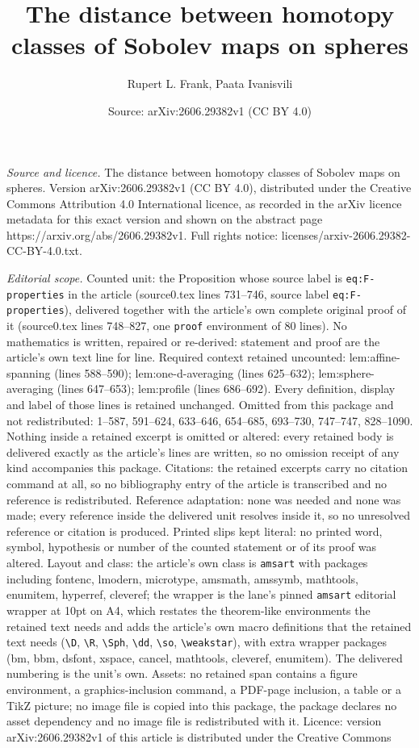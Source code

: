 \documentclass[10pt,a4paper]{amsart}
\title[The distance between homotopy classes of Sobolev maps on sph]{The distance between homotopy classes of Sobolev maps on spheres}
\author{Rupert L. Frank, Paata Ivanisvili}
\date{Source: arXiv:2606.29382v1 (CC BY 4.0)}
\begin{document}
\maketitle

\noindent\emph{Source and licence.} The distance between homotopy classes of Sobolev maps on spheres. Version arXiv:2606.29382v1 (CC BY 4.0), distributed under the Creative Commons Attribution 4.0 International licence, as recorded in the arXiv licence metadata for this exact version and shown on the abstract page https://arxiv.org/abs/2606.29382v1. Full rights notice: licenses/arxiv-2606.29382-CC-BY-4.0.txt.\par\smallskip

\noindent\textit{Editorial scope.} Counted unit: the Proposition whose source label is \texttt{eq:F-properties} in the article (source0.tex lines 731--746, source label \texttt{eq:F-properties}), delivered together with the article's own complete original proof of it (source0.tex lines 748--827, one \texttt{proof} environment of 80 lines). No mathematics is written, repaired or re-derived: statement and proof are the article's own text line for line. Required context retained uncounted: lem:affine-spanning (lines 588--590); lem:one-d-averaging (lines 625--632); lem:sphere-averaging (lines 647--653); lem:profile (lines 686--692). Every definition, display and label of those lines is retained unchanged. Omitted from this package and not redistributed: 1--587, 591--624, 633--646, 654--685, 693--730, 747--747, 828--1090. Nothing inside a retained excerpt is omitted or altered: every retained body is delivered exactly as the article's lines are written, so no omission receipt of any kind accompanies this package. Citations: the retained excerpts carry no citation command at all, so no bibliography entry of the article is transcribed and no reference is redistributed. Reference adaptation: none was needed and none was made; every reference inside the delivered unit resolves inside it, so no unresolved reference or citation is produced. Printed slips kept literal: no printed word, symbol, hypothesis or number of the counted statement or of its proof was altered. Layout and class: the article's own class is \texttt{amsart} with packages including fontenc, lmodern, microtype, amsmath, amssymb, mathtools, enumitem, hyperref, cleveref; the wrapper is the lane's pinned \texttt{amsart} editorial wrapper at 10pt on A4, which restates the theorem-like environments the retained text needs and adds the article's own macro definitions that the retained text needs (\texttt{\textbackslash D}, \texttt{\textbackslash R}, \texttt{\textbackslash Sph}, \texttt{\textbackslash dd}, \texttt{\textbackslash so}, \texttt{\textbackslash weakstar}), with extra wrapper packages (bm, bbm, dsfont, xspace, cancel, mathtools, cleveref, enumitem). The delivered numbering is the unit's own. Assets: no retained span contains a figure environment, a graphics-inclusion command, a PDF-page inclusion, a table or a TikZ picture; no image file is copied into this package, the package declares no asset dependency and no image file is redistributed with it. Licence: version arXiv:2606.29382v1 of this article is distributed under the Creative Commons 
\end{document}
